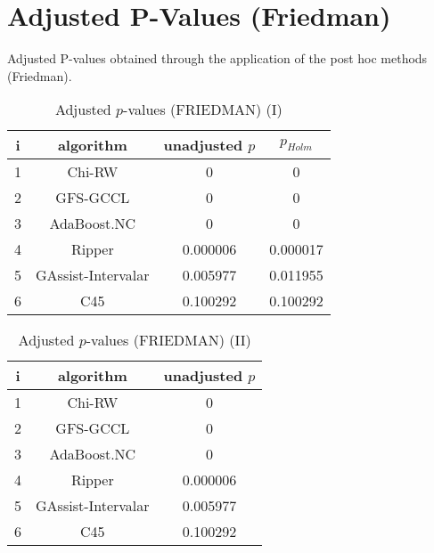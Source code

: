 \documentclass[a4paper,10pt]{article}
\begin{document}
\newpage

\section{Adjusted P-Values (Friedman)}


Adjusted P-values obtained through the application of the post hoc methods (Friedman).

\begin{table}[!htp]
\centering\small
\begin{tabular}{cccc}
i&algorithm&unadjusted $p$&$p_{Holm}$\\
\hline1& Chi-RW &0&0\\2& GFS-GCCL &0&0\\3& AdaBoost.NC &0&0\\4& Ripper&0.000006&0.000017\\5& GAssist-Intervalar &0.005977&0.011955\\6& C45 &0.100292&0.100292\\\hline
\end{tabular}
\caption{Adjusted $p$-values (FRIEDMAN) (I)}
\end{table}
\begin{table}[!htp]
\centering\small
\begin{tabular}{ccc}
i&algorithm&unadjusted $p$\\
\hline1& Chi-RW &0\\2& GFS-GCCL &0\\3& AdaBoost.NC &0\\4& Ripper&0.000006\\5& GAssist-Intervalar &0.005977\\6& C45 &0.100292\\\hline
\end{tabular}
\caption{Adjusted $p$-values (FRIEDMAN) (II)}
\end{table}

\newpage
\end{document}
